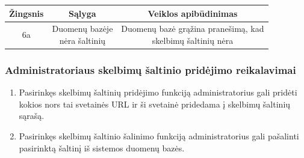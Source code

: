 \documentclass[12pt]{article}
\begin{document}
\begin{center}
		\begin{tabular}{ | c | c | c | }
			\hline
			Žingsnis & Sąlyga         & Veiklos apibūdinimas \\ \hline
			6a       & \makecell{Duomenų bazėje \\ nėra šaltinių} & \makecell{Duomenų bazė grąžina pranešimą, kad \\ skelbimų šaltinių nėra} \\ \hline
		\end{tabular}
		\end{center}
	
	\subsubsection{Administratoriaus skelbimų šaltinio pridėjimo reikalavimai}
	\begin{enumerate}[labelindent=10pt,leftmargin=2.2cm]
		\item Pasirinkęs skelbimų šaltinių pridėjimo funkciją administratorius gali pridėti kokios nors tai svetainės URL ir ši svetainė pridedama į skelbimų šaltinių sąrašą.
		\item Pasirinkęs skelbimų šaltinio šalinimo funkciją administratorius gali pašalinti pasirinktą šaltinį iš sistemos duomenų bazės. 
	\end{enumerate}
		
\end{document}
